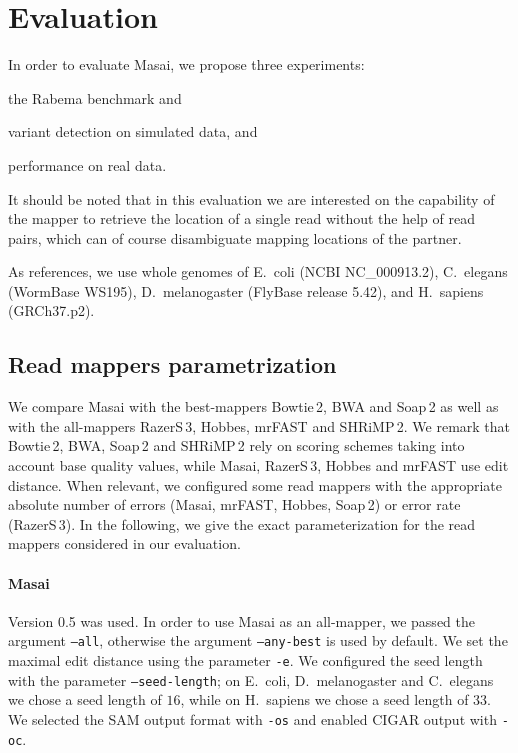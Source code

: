 \section{Evaluation}

In order to evaluate Masai, we propose three experiments: \begin{inparaenum}[(i)]
\item the Rabema benchmark and
\item variant detection on simulated data, and
\item performance on real data.
\end{inparaenum}

It should be noted that in this evaluation we are interested on the capability of the mapper to retrieve the location of a single read without the help of read pairs, which can of course disambiguate mapping locations of the partner.

As references, we use whole genomes of E.~coli (NCBI NC\_000913.2), C.~elegans (WormBase WS195), D.~melanogaster (FlyBase release 5.42), and H.~sapiens (GRCh37.p2).

\subsection{Read mappers parametrization}

We compare Masai with the best-mappers Bowtie\,2, BWA and Soap\,2 as well as with the all-mappers RazerS\,3, Hobbes, mrFAST and SHRiMP\,2.
We remark that Bowtie\,2, BWA, Soap\,2 and SHRiMP\,2 rely on scoring schemes taking into account base quality values, while Masai, RazerS\,3, Hobbes and mrFAST use edit distance.
When relevant, we configured some read mappers with the appropriate absolute number of errors (Masai, mrFAST, Hobbes, Soap\,2) or error rate (RazerS\,3).
In the following, we give the exact parameterization for the read mappers considered in our evaluation.

\paragraph{Masai}
Version 0.5 was used.
In order to use Masai as an all-mapper, we passed the argument \texttt{--all}, otherwise the argument \texttt{--any-best} is used by default.
We set the maximal edit distance using the parameter \texttt{-e}.
We configured the seed length with the parameter \texttt{--seed-length}; on E.~coli, D.~melanogaster and C.~elegans we chose a seed length of $16$, while on H.~sapiens we chose a seed length of $33$.
We selected the SAM output format with \texttt{-os} and enabled CIGAR output with \texttt{-oc}.

